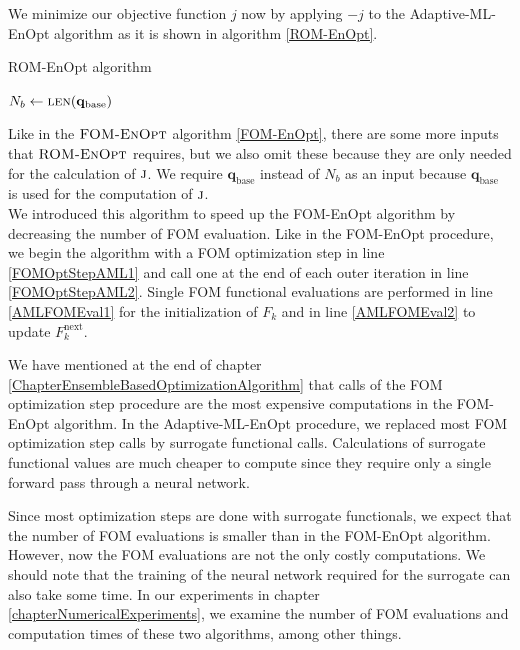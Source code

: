 We minimize our objective function $j$ now by applying $-j$ to the Adaptive-ML-EnOpt algorithm as it is shown in algorithm \ref{ROM-EnOpt}.

\begin{algorithm}[H]%
\caption{\label{ROM-EnOpt}ROM-EnOpt algorithm}
\begin{algorithmic}[1]
\State $N_b\gets \Call{len}{\mathbf{q}_\mathrm{base}}$
\State \Return {}
\EndFunction
\end{algorithmic}
\end{algorithm}

Like in the $\textproc{FOM-EnOpt}$ algorithm \ref{FOM-EnOpt}, there are some more inputs that $\textproc{ROM-EnOpt}$ requires, but we also omit these because they are only needed for the calculation of $\textproc{j}$. We require $\mathbf{q}_\mathrm{base}$ instead of $N_b$ as an input because $\mathbf{q}_\mathrm{base}$ is used for the computation of $\textproc{j}$.\\

We introduced this algorithm to speed up the FOM-EnOpt algorithm by decreasing the number of FOM evaluation. Like in the FOM-EnOpt procedure, we begin the algorithm with a FOM optimization step in line \ref{FOMOptStepAML1} and call one at the end of each outer iteration in line \ref{FOMOptStepAML2}. Single FOM functional evaluations are performed in line \ref{AMLFOMEval1} for the initialization of $F_k$ and in line \ref{AMLFOMEval2} to update $F^\mathrm{next}_k$.

We have mentioned at the end of chapter \ref{ChapterEnsembleBasedOptimizationAlgorithm} that calls of the FOM optimization step procedure are the most expensive computations in the FOM-EnOpt algorithm. In the Adaptive-ML-EnOpt procedure, we replaced most FOM optimization step calls by surrogate functional calls. Calculations of surrogate functional values are much cheaper to compute since they require only a single forward pass through a neural network.

Since most optimization steps are done with surrogate functionals, we expect that the number of FOM evaluations is smaller than in the FOM-EnOpt algorithm. However, now the FOM evaluations are not the only costly computations. We should note that the training of the neural network required for the surrogate can also take some time. In our experiments in chapter \ref{chapterNumericalExperiments}, we examine the number of FOM evaluations and computation times of these two algorithms, among other things.